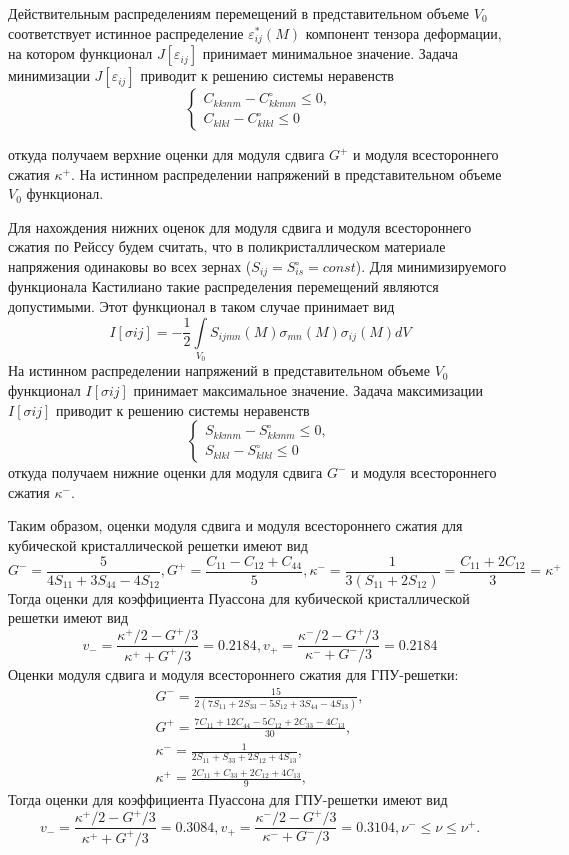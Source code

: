 \documentclass[12pt, a4paper]{article}
\begin{document}
Действительным распределениям перемещений в представительном объеме $V_0$ соответствует истинное распределение $\varepsilon_{ij}^{*} (M)$ компонент тензора деформации, на котором функционал $J[\varepsilon_{ij}]$ принимает минимальное значение.
Задача минимизации $J[\varepsilon_{ij}]$ приводит к решению системы неравенств
\[
\begin{cases}
	C_{kkmm} - C_{kkmm}^{\circ} \leq 0,\\
	C_{klkl} - C_{klkl}^{\circ} \leq 0
\end{cases}
\]

откуда получаем верхние оценки для модуля сдвига $G^+$ и модуля всестороннего сжатия $\kappa^+$.
На истинном распределении напряжений в представительном объеме $V_0$ функционал.

Для нахождения нижних оценок для модуля сдвига и модуля всестороннего сжатия по Рейссу будем считать, что в поликристаллическом материале напряжения одинаковы во всех зернах ($S_{ij} = S_{is}^{\circ} = const$). Для минимизируемого функционала Кастилиано такие распределения перемещений являются допустимыми. Этот функционал в таком случае принимает вид
\[
I[\sigma i j] = - \frac{1}{2} \int \limits_{V_0} {S_{ijmn} (M) \sigma_{mn} (M) \sigma_{ij} (M) dV}
\]
На истинном распределении напряжений в представительном объеме $V_0$ функционал $I[\sigma i j]$ принимает максимальное значение.
Задача максимизации $I[\sigma i j]$ приводит к решению системы неравенств
\[
\begin{cases}
	S_{kkmm} - S_{kkmm}^{\circ} \leq 0,\\
	S_{klkl} - S_{klkl}^{\circ} \leq 0
\end{cases}
\]
откуда получаем нижние оценки для модуля сдвига $G^{-}$ и модуля всестороннего сжатия $\kappa^{-}$.

Таким образом, оценки модуля сдвига и модуля всестороннего сжатия для кубической кристаллической решетки имеют вид
\[
G^{-} = \frac{5}{4 S_{11} + 3 S_{44} - 4 S_{12}},
G^{+} = \frac{C_{11} - C_{12} + C_{44}}{5},
\kappa^{-} = \frac{1}{3 (S_{11} + 2 S_{12})} = \frac{C_{11} + 2 C_{12}}{3} = \kappa^{+}
\]
Тогда оценки для коэффициента Пуассона для кубической кристаллической решетки
имеют вид
\[
v_{-} = \frac{\kappa^{+} / 2 - G^{+} / 3}{\kappa^{+} + G^{+} / 3} = 0.2184,
v_{+} = \frac{\kappa^{-} / 2 - G^{+} / 3}{\kappa^{-} + G^{-} / 3} = 0.2184
\]
Оценки модуля сдвига и модуля всестороннего сжатия для ГПУ-решетки:
\begin{gather*}
	G^{-} = \frac{15}{2(7 S_{11} + 2 S_{33} - 5 S_{12} + 3 S_{44} - 4 S_{13})},\\
	G^{+} = \frac{7 C_{11} + 12 C_{44} - 5 C_{12} + 2 C_{33} - 4 C_{13}}{30},\\
	\kappa^{-} = \frac{1}{2 S_{11} + S_{33} + 2 S_{12} + 4 S_{13}},\\
	\kappa^{+} = \frac{2 C_{11} + C_{33} + 2 C_{12} + 4 C_{13}}{9},
\end{gather*}
Тогда оценки для коэффициента Пуассона для ГПУ-решетки имеют вид
\[
v_{-} = \frac{\kappa^{+} / 2 - G^{+} / 3}{\kappa^{+} + G^{+} / 3} = 0.3084,
v_{+} = \frac{\kappa^{-} / 2 - G^{+} / 3}{\kappa^{-} + G^{-} / 3} = 0.3104,
\nu^{-} \leq \nu \leq \nu^{+}.
\]
\end{document}

